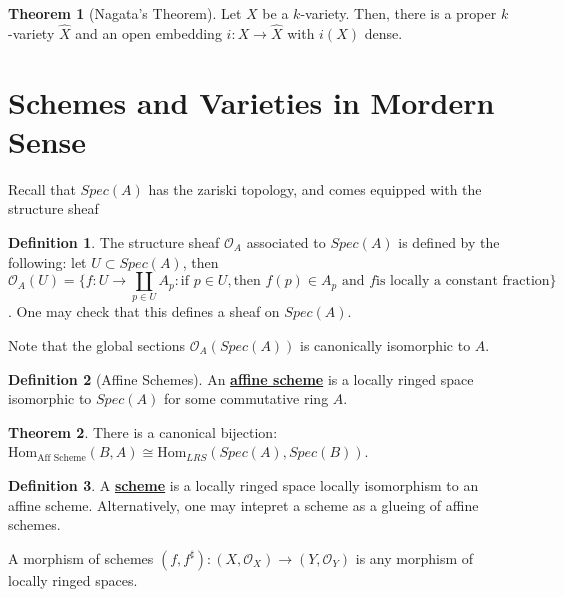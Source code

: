 \documentclass{article}
\theoremstyle{definition}
\newtheorem{theorem}{Theorem}[section]
\theoremstyle{definition}
\newtheorem{definition}{Definition}[theorem]
\theoremstyle{definition}
\theoremstyle{definition}
\theoremstyle{definition}
\theoremstyle{definition}
\theoremstyle{definition}
\begin{document}
\begin{tcolorbox}[colback=red!5!white,colframe=red!30!white]
\begin{theorem}[Nagata's Theorem]
Let $X$ be a $k$-variety. Then, there is a proper $k$-variety $\widehat{X}$ and an open embedding $i: X\to \widehat{X}$ with $i(X)$ dense. 
\end{theorem}
\end{tcolorbox}


\section{Schemes and Varieties in Mordern Sense}

Recall that $Spec(A)$ has the zariski topology, and comes equipped with the structure sheaf 


\begin{tcolorbox}[colback=purple!5!white,colframe=purple!75!black]
\begin{definition}
The structure sheaf $\mathcal{O}_A$ associated to $Spec(A)$ is defined by the following: let $U\subset Spec(A)$, then $$\mathcal{O}_A(U)=\{f: U\to \coprod_{p\in U}A_p: \textrm{if } p\in U, \textrm{then } f(p)\in A_p \textrm{ and } f \textrm{is locally a constant fraction}\}$$.
One may check that this defines a sheaf on $Spec(A)$. 
\end{definition}
\end{tcolorbox}
Note that the global sections $\mathcal{O}_A(Spec(A))$ is canonically isomorphic to $A$.


\begin{tcolorbox}[colback=purple!5!white,colframe=purple!75!black]
\begin{definition}[Affine Schemes]
An \underline{\textbf{affine scheme}} is a locally ringed space isomorphic to $Spec(A)$ for some commutative ring $A$. 
\end{definition}
\end{tcolorbox}


\begin{tcolorbox}[colback=red!5!white,colframe=red!30!white]
\begin{theorem}
There is a canonical bijection:
$\textrm{Hom}_{\textrm{Aff Scheme}}(B,A)\cong \textrm{Hom}_{LRS}(Spec(A), Spec(B))$. 
\end{theorem}
\end{tcolorbox}


\begin{tcolorbox}[colback=purple!5!white,colframe=purple!75!black]
\begin{definition}
A \underline{\textbf{scheme}} is a locally ringed space locally isomorphism to an affine scheme. Alternatively, one may intepret a scheme as a glueing of affine schemes. 

A morphism of schemes $(f,f^{\sharp}):(X,\mathcal{O}_X)\to (Y,\mathcal{O}_Y)$ is any morphism of locally ringed spaces. 
\end{definition}
\end{tcolorbox}
\end{document}
